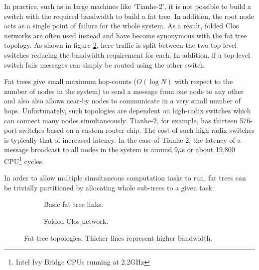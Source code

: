				In practice, such as in large machines like `Tianhe-2', it is not
				possible to build a switch with the required bandwidth to build a fat
				tree. In addition, the root node acts as a single point of failure for
				the whole system. As a result, folded Clos networks are often used
				instead and have become synonymous with the fat tree topology. As shown
				in figure \ref{fig:fat-tree-closs}, here traffic is split between the
				two top-level switches reducing the bandwidth requirement for each. In
				addition, if a top-level switch fails messages can simply be routed
				using the other switch.
				
				Fat trees give small maximum hop-counts ($O(\log{N})$ with respect to
				the number of nodes in the system) to send a message from one node to
				any other and also also allows near-by nodes to communicate in a very
				small number of hops. Unfortunately, such topologies are dependent on
				high-radix switches which can connect many nodes simultaneously.
				Tianhe-2, for example, has thirteen 576-port switches based on a custom
				router chip. The cost of such high-radix switches is typically that of
				increased latency. In the case of Tianhe-2, the latency of a message
				broadcast to all nodes in the system is around 9$\mu$s or about 19,800
				CPU\footnote{Intel Ivy Bridge CPUs running at 2.2GHz}
				cycles\cite{dongarra13}.
				
				In order to allow multiple simultaneous computation tasks to run, fat
				trees can be trivially partitioned by allocating whole sub-trees to a
				given task.
				
				\begin{figure}
					\begin{subfigure}[t]{\textwidth}
						\center
						
						\caption{Basic fat tree links.}
						\label{fig:fat-tree-concept}
					\end{subfigure}
					
					\vspace{1em}
					
					\begin{subfigure}[t]{\textwidth}
						\center
						
						\caption{Folded Clos network.}
						\label{fig:fat-tree-closs}
					\end{subfigure}
					
					\caption[Fat tree topologies.]{Fat tree topologies. Thicker lines
					represent higher bandwidth.}
					\label{fig:fat-tree}
				\end{figure}
			
